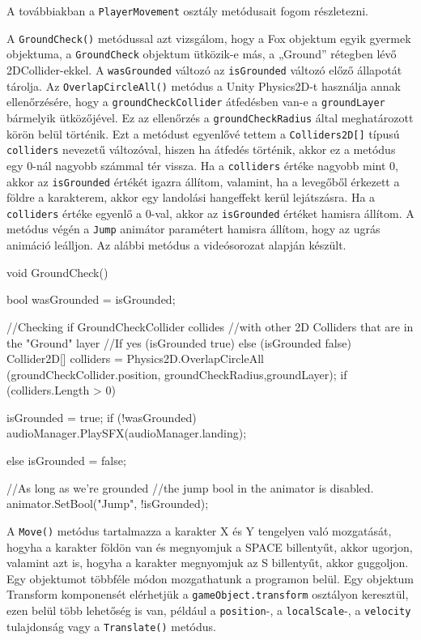 A továbbiakban a \texttt{PlayerMovement} osztály metódusait fogom részletezni.

A \texttt{GroundCheck()} metódussal azt vizsgálom, hogy a Fox objektum egyik gyermek objektuma, a \texttt{GroundCheck}  objektum ütközik-e más, a „Ground” rétegben lévő 2DCollider-ekkel. A \texttt{wasGrounded} változó az \texttt{isGrounded} változó előző állapotát tárolja. Az \texttt{OverlapCircleAll()} metódus a Unity Physics2D-t használja annak ellenőrzésére, hogy a \texttt{groundCheckCollider} átfedésben van-e a \texttt{groundLayer} bármelyik ütközőjével. Ez az ellenőrzés a \texttt{groundCheckRadius} által meghatározott körön belül történik. Ezt a metódust egyenlővé tettem a \texttt{Colliders2D[]} típusú \texttt{colliders} nevezetű változóval, hiszen ha átfedés történik, akkor ez a metódus egy 0-nál nagyobb számmal tér vissza. Ha a \texttt{colliders} értéke nagyobb mint 0, akkor az \texttt{isGrounded} értékét igazra állítom, valamint, ha a levegőből érkezett a földre a karakterem, akkor egy landolási hangeffekt kerül lejátszásra. Ha a \texttt{colliders} értéke egyenlő a 0-val, akkor az \texttt{isGrounded} értéket hamisra állítom. A metódus végén a \texttt{Jump} animátor paramétert hamisra állítom, hogy az ugrás animáció leálljon. Az alábbi metódus a \cite{youtubeplaylist} videósorozat alapján készült.

\begin{java}
void GroundCheck()
{
    bool wasGrounded = isGrounded;

    //Checking if GroundCheckCollider collides
    //with other 2D Colliders that are in the "Ground" layer
    //If yes (isGrounded true) else (isGrounded false)
    Collider2D[] colliders = 
        Physics2D.OverlapCircleAll
        (groundCheckCollider.position, 
        groundCheckRadius,groundLayer);
    if (colliders.Length > 0)
    {
        isGrounded = true;
        if (!wasGrounded)
        {
            audioManager.PlaySFX(audioManager.landing);
        }

    }
    else
    {
        isGrounded = false;
    }    

    //As long as we're grounded
    //the jump bool in the animator is disabled.
    animator.SetBool("Jump", !isGrounded);
}
\end{java}

A \texttt{Move()} metódus tartalmazza a karakter X és Y tengelyen való mozgatását, hogyha a karakter földön van és megnyomjuk a SPACE billentyűt, akkor ugorjon, valamint azt is, hogyha a karakter megnyomjuk az S billentyűt, akkor guggoljon. Egy objektumot többféle módon mozgathatunk a programon belül. Egy objektum Transform komponensét elérhetjük a \texttt{gameObject.transform} osztályon keresztül, ezen belül több lehetőség is van, például a \texttt{position}-, a \texttt{localScale}-, a \texttt{velocity} tulajdonság vagy a \texttt{Translate()} metódus.

